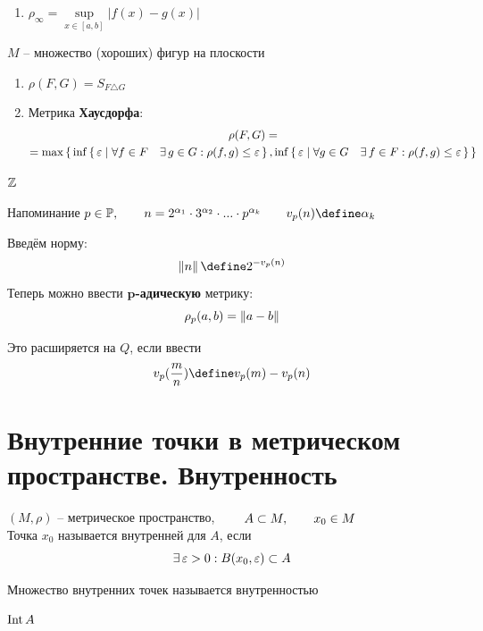 \begin{exmpls}
\begin{enumerate}
		\item $ \rho_\infty = \sup\limits_{x \in [a, b]} |f(x) - g(x)| $
	\end{enumerate}
	\item $ M $ -- множество (хороших) фигур на плоскости
	\begin{enumerate}
		\item $ \rho(F, G) = S_{F \triangle G} $
		\item Метрика \textbf{Хаусдорфа}:
		\begin{multline*}
			\rho(F, G) = \\ = \max\set{\inf\set{\varepsilon| \forall f \in F \quad \exists\,g \in G : \rho(f, g) \le \varepsilon}, \inf\set{\varepsilon| \forall g \in G \quad \exists\,f \in F : \rho(f, g) \le \varepsilon}}
		\end{multline*}
	\end{enumerate}
	\item $ \mathbb{Z} $
	\begin{undefthm}{Напоминание}
		$ p \in \Prime, \qquad n = 2^{\alpha_1} \cdot 3^{\alpha_2} \cdot ... \cdot p^{\alpha_k} \qquad v_p(n) \define \alpha_k $
	\end{undefthm}
	Введём норму:
	$$ \norm{n} \define 2^{-v_p(n)} $$
	Теперь можно ввести $ \bm{p} $\textbf{-адическую} метрику:
	$$ \rho_p(a, b) = \left\|{a - b}\right\| $$
	\begin{remark}
		Это расширяется на $ Q $, если ввести
		$$ v_p(\frac{m}n) \define v_p(m) - v_p(n) $$
	\end{remark}
\end{exmpls}

\section{Внутренние точки в метрическом пространстве. Внутренность}

\begin{definition}
	$ (M, \rho) $ -- метрическое пространство, $ \qquad A \subset M, \qquad x_0 \in M $ \\
	Точка $ x_0 $ называется внутренней для $ A $, если
	$$ \exists\, \varepsilon > 0 : B(x_0, \varepsilon) \subset A $$
\end{definition}

\begin{definition}
	Множество внутренних точек называется внутренностью
\end{definition}

\begin{notation}
	$ \operatorname{Int} A $
\end{notation}

